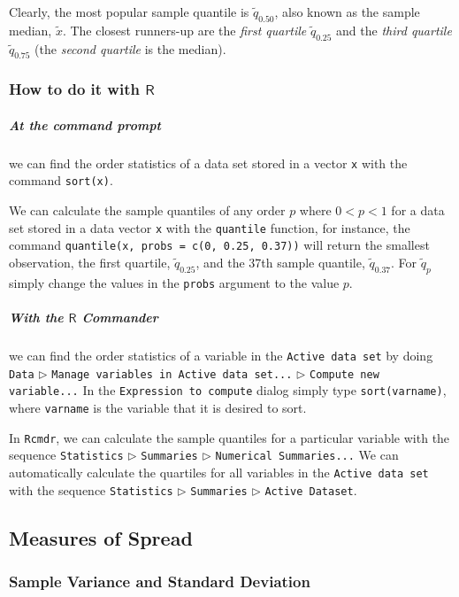\documentclass[captions=tableheading]{scrbook}
\begin{document}
Clearly, the most popular sample quantile is \(\tilde{q}_{0.50}\), also known as the sample median, \(\tilde{x}\). The closest runners-up are the \emph{first quartile} \(\tilde{q}_{0.25}\) and the \emph{third quartile} \(\tilde{q}_{0.75}\) (the \emph{second quartile} is the median). 
\subsubsection{How to do it with \(\mathsf{R}\)}
\label{sec-2-3-3-1}


\subparagraph*{At the command prompt}
we can find the order statistics of a data set stored in a vector \texttt{x} with the command \texttt{sort(x)}.

We can calculate the sample quantiles of any order \(p\) where \(0<p<1\) for a data set stored in a data vector \texttt{x} with the \texttt{quantile} function, for instance, the command \texttt{quantile(x, probs = c(0, 0.25, 0.37))} will return the smallest observation, the first quartile, \(\tilde{q}_{0.25}\), and the 37th sample quantile, \(\tilde{q}_{0.37}\). For \(\tilde{q}_{p}\) simply change the values in the \texttt{probs} argument to the value \(p\).


\subparagraph*{With the \(\mathsf{R}\) Commander}
we can find the order statistics of a variable in the \texttt{Active data set} by doing \texttt{Data} \(\triangleright\) \texttt{Manage variables in Active data set...} \(\triangleright\) \texttt{Compute new variable...} In the \texttt{Expression to compute} dialog simply type \texttt{sort(varname)}, where \texttt{varname} is the variable that it is desired to sort.

In \texttt{Rcmdr}, we can calculate the sample quantiles for a particular variable with the sequence \texttt{Statistics} \(\triangleright\) \texttt{Summaries} \(\triangleright\) \texttt{Numerical Summaries...} We can automatically calculate the quartiles for all variables in the \texttt{Active data set} with the sequence \texttt{Statistics} \(\triangleright\) \texttt{Summaries} \(\triangleright\) \texttt{Active Dataset}.
\subsection{Measures of Spread}
\label{sec-2-3-4}
\label{sub:Measures-of-Spread}
\subsubsection{Sample Variance and Standard Deviation}
\label{sec-2-3-4-1}
\end{document}
